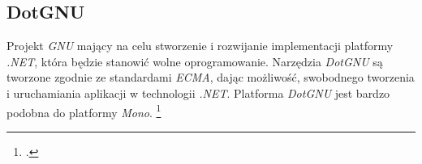 \subsection{DotGNU}
\par Projekt \textit{GNU} mający na celu stworzenie i rozwijanie implementacji platformy \textit{.NET}, która będzie stanowić wolne oprogramowanie. Narzędzia \textit{DotGNU} są tworzone zgodnie ze standardami \textit{ECMA}, dając możliwość, swobodnego tworzenia i uruchamiania aplikacji w technologii \textit{.NET}. Platforma \textit{DotGNU} jest bardzo podobna do platformy \textit{Mono}. \footcite{DotGNU}

